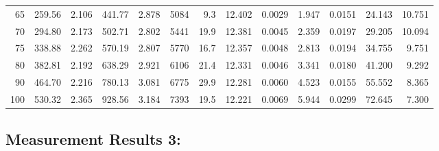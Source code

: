 \documentclass[10pt]{article}
\begin{document}
{\begin{tabular}{|r|rr|rr|rr|rr|rr|r|r|}
       65 &       259.56 &        2.106 &       441.77 &        2.878 &         5084 &          9.3 &       12.402 &       0.0029 &        1.947 &       0.0151 &       24.143 &       10.751 \\
       70 &       294.80 &        2.173 &       502.71 &        2.802 &         5441 &         19.9 &       12.381 &       0.0045 &        2.359 &       0.0197 &       29.205 &       10.094 \\
       75 &       338.88 &        2.262 &       570.19 &        2.807 &         5770 &         16.7 &       12.357 &       0.0048 &        2.813 &       0.0194 &       34.755 &        9.751 \\
       80 &       382.81 &        2.192 &       638.29 &        2.921 &         6106 &         21.4 &       12.331 &       0.0046 &        3.341 &       0.0180 &       41.200 &        9.292 \\
       90 &       464.70 &        2.216 &       780.13 &        3.081 &         6775 &         29.9 &       12.281 &       0.0060 &        4.523 &       0.0155 &       55.552 &        8.365 \\
      100 &       530.32 &        2.365 &       928.56 &        3.184 &         7393 &         19.5 &       12.221 &       0.0069 &        5.944 &       0.0299 &       72.645 &        7.300 \\
\hline
\end{tabular}
}



\subsection*{\large \bf Measurement Results 3:}
\end{document}
